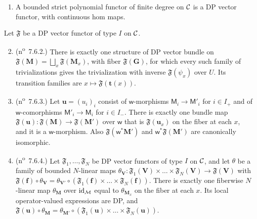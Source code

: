 \begin{theorem}\label{dp:thm:functors-dp}
\leavevmode
\begin{enumerate}
\item A bounded strict polynomial functor of finite degree on $\mathcal{C}$ is a DP vector functor, with continuous hom maps.
\end{enumerate}
Let $\mathfrak F$ be a DP vector functor of type $I$ on $\mathcal{C}$.
\begin{enumerate}
\setcounter{enumi}{1}
\item \textup{(n\textsuperscript{o}~7.6.2.)} There is exactly one structure of DP vector bundle on $\mathfrak F(\mathbf M)=\bigsqcup_x\mathfrak F(\mathbf M_x)$, with fiber $\mathfrak F(\mathbf G)$, for which every such family of trivializations gives the trivialization with inverse $\mathfrak F(\psi_x)$ over $U$. Its transition families are $x\mapsto\mathfrak F(\mathbf t(x))$.
\item \textup{(n\textsuperscript{o}~7.6.3.)} Let $\mathbf u=(u_i)_i$ consist of $\mathsf w$-morphisms $\mathsf M_i\to\mathsf M'_i$ for $i\in I_+$ and of $\mathsf w$-comorphisms $\mathsf M'_i\to\mathsf M_i$ for $i\in I_-$. There is exactly one bundle map $\mathfrak F(\mathbf u)\colon\mathfrak F(\mathbf M)\to\mathfrak F(\mathbf M')$ over $\mathsf w$ that is $\mathfrak F(\mathbf u_x)$ on the fiber at each $x$, and it is a $\mathsf w$-morphism. Also $\mathfrak F(\mathsf w^*\mathbf M')$ and $\mathsf w^*\mathfrak F(\mathbf M')$ are canonically isomorphic.
\item \textup{(n\textsuperscript{o}~7.6.4.)} Let $\mathfrak F_1,\dots,\mathfrak F_N$ be DP vector functors of type $I$ on $\mathcal{C}$, and let $\theta$ be a family of bounded $N$\nobreakdash-linear maps $\theta_{\mathbf V}\colon\mathfrak F_1(\mathbf V)\times\dots\times\mathfrak F_N(\mathbf V)\to\mathfrak F(\mathbf V)$ with $\mathfrak F(\mathbf f)\circ\theta_{\mathbf V}=\theta_{\mathbf V'}\circ(\mathfrak F_1(\mathbf f)\times\dots\times\mathfrak F_N(\mathbf f))$. There is exactly one fiberwise $N$\nobreakdash-linear map $\theta_{\mathbf M}$ over $\mathrm{id}_{\mathcal M}$ equal to $\theta_{\mathbf M_x}$ on the fiber at each $x$. Its local operator-valued expressions are DP, and $\mathfrak F(\mathbf u)\circ\theta_{\mathbf M}=\theta_{\mathbf M'}\circ(\mathfrak F_1(\mathbf u)\times\dots\times\mathfrak F_N(\mathbf u))$.
\end{enumerate}
\end{theorem}

